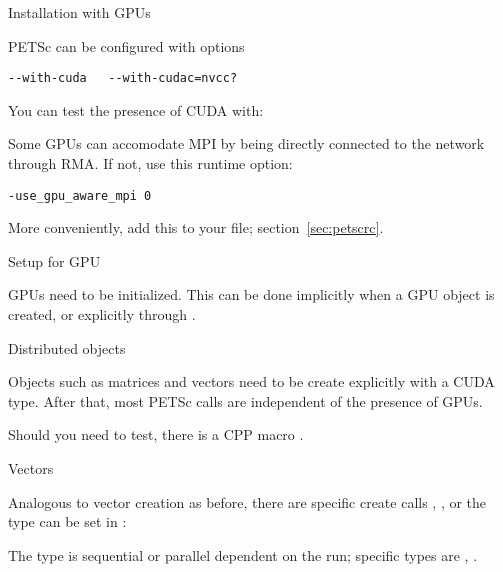 
 {Installation with GPUs}

PETSc can be configured with options
\begin{verbatim}
--with-cuda   --with-cudac=nvcc?
\end{verbatim}
You can test the presence of CUDA with:


Some GPUs can accomodate MPI by being directly connected to the network
through  \ac{RMA}.
If not, use this runtime option:
\begin{verbatim}
-use_gpu_aware_mpi 0
\end{verbatim}
More conveniently, add this to your  file;
section~\ref{sec:petscrc}.

 {Setup for GPU}

GPUs need to be initialized.
This can be done implicitly when a GPU object is created,
or explicitly through .


 {Distributed objects}

Objects such as matrices and vectors need to be create
explicitly with a CUDA type.
After that, most PETSc calls are independent of the presence of GPUs.

Should you need to test, there is a \ac{CPP} macro
.

 {Vectors}

Analogous to vector creation as before,
there are specific create calls
,
,
or the type can be set in :


The type
is sequential or parallel dependent on the run;
specific types are 
,
.

